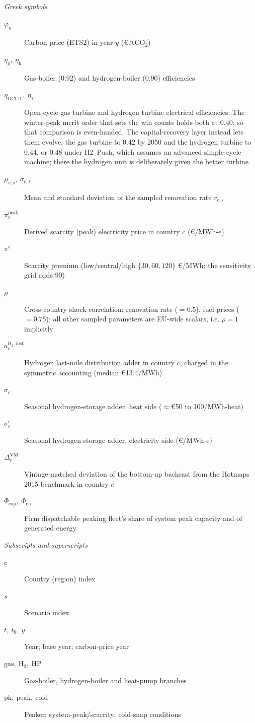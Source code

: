 \documentclass[review]{elsarticle}
\begin{document}
\textit{Greek symbols}
\begin{description}
 \item[$\varphi_{y}$] Carbon price (ETS2) in year $y$ (\euro{}/tCO$_2$)
 \item[$\eta_{\mathrm{g}},\ \eta_{\mathrm{h}}$] Gas-boiler (0.92) and hydrogen-boiler (0.90) efficiencies
 \item[$\eta_{\mathrm{OCGT}},\ \eta_{\mathrm{T}}$] Open-cycle gas turbine and hydrogen turbine electrical efficiencies. The winter-peak merit order that sets the win counts holds both at $0.40$, so that comparison is even-handed. The capital-recovery layer instead lets them evolve, the gas turbine to $0.42$ by 2050 and the hydrogen turbine to $0.44$, or $0.48$ under H2~Push, which assumes an advanced simple-cycle machine; there the hydrogen unit is deliberately given the better turbine
 \item[$\mu_{c,s},\ \sigma_{c,s}$] Mean and standard deviation of the sampled renovation rate $r_{c,s}$
 \item[$\pi^{\mathrm{peak}}_{c}$] Derived scarcity (peak) electricity price in country $c$ (\euro{}/MWh-e)
 \item[$\pi^{\mathrm{s}}$] Scarcity premium (low/central/high $\{30,60,120\}$ \euro{}/MWh; the sensitivity grid adds 90)
 \item[$\rho$] Cross-country shock correlation: renovation rate ($=0.5$),
 fuel prices ($=0.75$); all other sampled parameters are EU-wide scalars, i.e.
 $\rho=1$ implicitly
 \item[$a^{\mathrm{H_2,dist}}_{c}$] Hydrogen last-mile distribution adder in country $c$, charged in the symmetric accounting (median \euro{}13.4/MWh)
 \item[$\sigma_{c}$] Seasonal hydrogen-storage adder, heat side ($\approx$\euro{}50 to 100/MWh-heat)
 \item[$\sigma^{e}_{c}$] Seasonal hydrogen-storage adder, electricity side (\euro{}/MWh-e)
 \item[$\Delta_{c}^{\mathrm{VM}}$] Vintage-matched deviation of the bottom-up backcast from the Hotmaps 2015 benchmark in country $c$
 \item[$\Phi_{\mathrm{cap}},\ \Phi_{\mathrm{en}}$] Firm dispatchable peaking fleet's share of system peak capacity and of generated energy
\end{description}

\textit{Subscripts and superscripts}
\begin{description}
 \item[$c$] Country (region) index
 \item[$s$] Scenario index
 \item[$t,\ t_{0},\ y$] Year; base year; carbon-price year
 \item[$\mathrm{gas},\ \mathrm{H_2},\ \mathrm{HP}$] Gas-boiler, hydrogen-boiler and heat-pump branches
 \item[$\mathrm{pk},\ \mathrm{peak},\ \mathrm{cold}$] Peaker; system-peak/scarcity; cold-snap conditions
\end{description}
\end{document}
